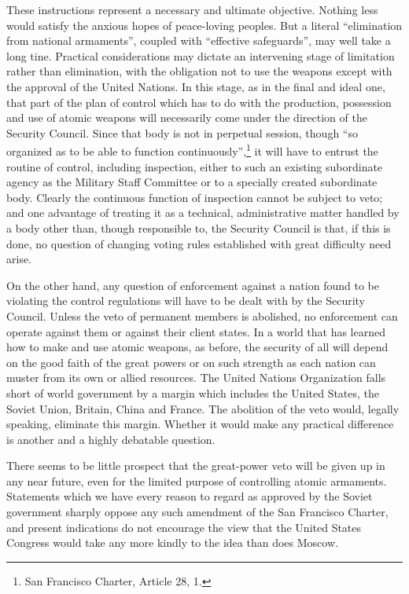 These instructions represent a necessary and ultimate objective. Nothing less would satisfy the anxious hopes of peace-loving peoples. But a literal ``elimination from national armaments'', coupled with ``effective safeguards'', may well take a long tine. Practical considerations may dictate an intervening stage of limitation rather than elimination, with the obligation not to use the weapons except with the approval of the United Nations. In this stage, as in the final and ideal one, that part of the plan of control which has to do with the production, possession and use of atomic weapons will necessarily come under the direction of the Security Council. Since that body is not in perpetual session, though ``so organized as to be able to function continuously'',\footnote{San Francisco Charter, Article 28, 1.} it will have to entrust the routine of control, including inspection, either to such an existing subordinate agency as the Military Staff Committee or to a specially created subordinate body. Clearly the continuous function of inspection cannot be subject to veto; and one advantage of treating it as a technical, administrative matter handled by a body other than, though responsible to, the Security Council is that, if this is done, no question of changing voting rules established with great difficulty need arise.

On the other hand, any question of enforcement against a nation found to be violating the control regulations will have to be dealt with by the Security Council. Unless the veto of permanent members is abolished, no enforcement can operate against them or against their client states. In a world that has learned how to make and use atomic weapons, as before, the security of all will depend on the good faith of the great powers or on such strength as each nation can muster from its own or allied resources. The United Nations Organization falls short of world government by a margin which includes the United States, the Soviet Union, Britain, China and France. The abolition of the veto would, legally speaking, eliminate this margin. Whether it would make any practical difference is another and a highly debatable question.

There seems to be little prospect that the great-power veto will be given up in any near future, even for the limited purpose of controlling atomic armaments. Statements which we have every reason to regard as approved by the Soviet government sharply oppose any such amendment of the San Francisco Charter, and present indications do not encourage the view that the United States Congress would take any more kindly to the idea than does Moscow.

